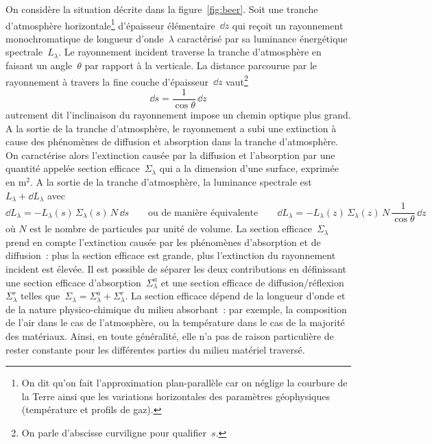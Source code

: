 \sk
On considère la situation décrite dans la figure~\ref{fig:beer}. Soit une tranche d'atmosphère horizontale\footnote{On dit qu'on fait l'approximation plan-parallèle car on néglige la courbure de la Terre ainsi que les variations horizontales des paramètres géophysiques (température et profils de gaz).} d'épaisseur élémentaire~$\dd z$ qui reçoit un rayonnement monochromatique de longueur d'onde~$\lambda$ caractérisé par sa luminance énergétique spectrale~$L_\lambda$. Le rayonnement incident traverse la tranche d'atmosphère en faisant un angle~$\theta$ par rapport à la verticale. La distance parcourue par le rayonnement à travers la fine couche d'épaisseur~$\dd z$ vaut\footnote{On parle d'abscisse curviligne pour qualifier~$s$.} 
\[ \dd s = \frac{1}{\cos\theta} \, \dd z \]
autrement dit l'inclinaison du rayonnement impose un chemin optique plus grand. A la sortie de la tranche d'atmosphère, le rayonnement a subi une extinction à cause des phénomènes de diffusion et absorption dans la tranche d'atmosphère. On caractérise alors l'extinction causée par la diffusion et l'absorption par une quantité appelée section efficace~$\Sigma_\lambda$ qui a la dimension d'une surface, exprimée en m$^2$. A la sortie de la tranche d'atmosphère, la luminance spectrale est~$L_\lambda + \dd L_\lambda$ avec 
\[ \dd L_\lambda = - L_\lambda(s) \, \Sigma_\lambda(s) \, N \, \dd s \qquad \textrm{ou de manière équivalente} \qquad \boxed{ \dd L_\lambda = - L_\lambda(z) \, \Sigma_\lambda(z) \, N \, \frac{1}{\cos\theta} \, \dd z } \]
où $N$ est le nombre de particules par unité de volume. La section efficace~$\Sigma_{\lambda}$ prend en compte l'extinction causée par les phénomènes d'absorption et de diffusion~: plus la section efficace est grande, plus l'extinction du rayonnement incident est élevée. Il est possible de séparer les deux contributions en définissant une section efficace d'absorption~$\Sigma_\lambda^a$ et une section efficace de diffusion/réflexion~$\Sigma_\lambda^r$ telles que~$\Sigma_{\lambda} = \Sigma_\lambda^a + \Sigma_\lambda^r$. La section efficace dépend de la longueur d'onde et de la nature physico-chimique du milieu absorbant~: par exemple, la composition de l'air dans le cas de l'atmosphère, ou la température dans le cas de la majorité des matériaux. Ainsi, en toute généralité, elle n'a pas de raison particulière de rester constante pour les différentes parties du milieu matériel traversé.


